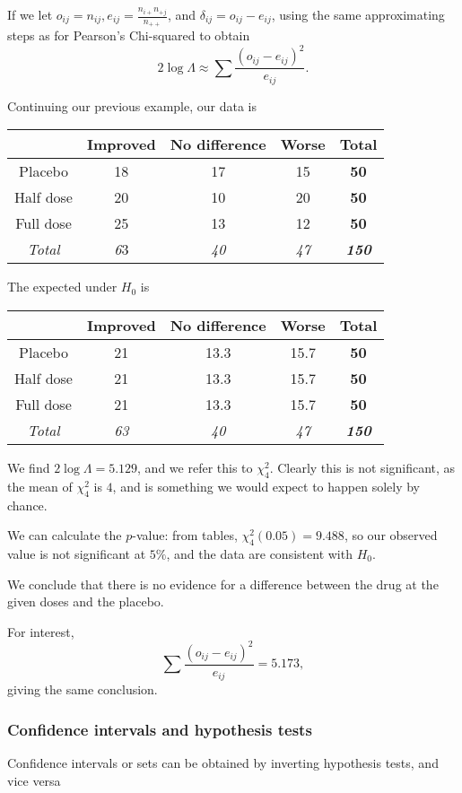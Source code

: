 \documentclass[a4paper]{article}
\begin{document}
If we let $o_{ij}= n_{ij}, e_{ij} = \frac{n_{i+}n_{+j}}{n_{++}}$, and $\delta_{ij} = o_{ij} - e_{ij}$, using the same approximating steps as for Pearson's Chi-squared to obtain
\[
  2\log \Lambda \approx \sum \frac{(o_{ij} - e_{ij})^2}{e_{ij}}.
\]
\begin{eg}
  Continuing our previous example, our data is

  \begin{tabular}{ccccc}
    \toprule
    & Improved & No difference & Worse & \textbf{Total}\\\midrule
    Placebo & 18 & 17 & 15 & \textbf{50} \\
    Half dose & 20 & 10 & 20 & \textbf{50} \\
    Full dose & 25 & 13 & 12& \textbf{50} \\\midrule
    \textit{Total} & \textit{6}3 & \textit{40} & \textit{47} & \textbf{\textit{150}} \\ \bottomrule
  \end{tabular}

  The expected under $H_0$ is

  \begin{tabular}{ccccc}
    \toprule
    & Improved & No difference & Worse &\textbf{Total}\\\midrule
    Placebo   & 21 & 13.3 & 15.7 & \textbf{50} \\
    Half dose & 21 & 13.3 & 15.7 & \textbf{50}\\
    Full dose & 21 & 13.3 & 15.7 & \textbf{50}\\\midrule
    \textit{Total}& \textit{63} & \textit{40} & \textit{47} & \textbf{\textit{150}}\\ \bottomrule
  \end{tabular}

  We find $2\log \Lambda = 5.129$, and we refer this to $\chi_4^2$. Clearly this is not significant, as the mean of $\chi_4^2$ is $4$, and is something we would expect to happen solely by chance.

  We can calculate the $p$-value: from tables, $\chi_4^2(0.05) = 9.488$, so our observed value is not significant at $5\%$, and the data are consistent with $H_0$.

  We conclude that there is no evidence for a difference between the drug at the given doses and the placebo.

  For interest,
  \[
    \sum\frac{(o_{ij} - e_{ij})^2}{e_{ij}} = 5.173,
  \]
  giving the same conclusion.
\end{eg}
\subsubsection{Confidence intervals and hypothesis tests}
Confidence intervals or sets can be obtained by inverting hypothesis tests, and vice versa
\end{document}
